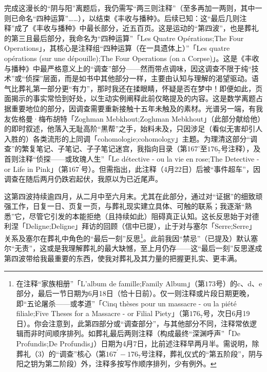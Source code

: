 完成这漫长的“阴与阳”离题后，我仍需写“两三则注释”（至多再加一两则，其中一则已命名“四种运算”……），以结束《丰收与播种》。后续已知：这“最后几则注释”成了《丰收与播种》中最长部分，近五百页。这是运动的“第四波”，也是葬礼的第三且最后部分，我命名为“四种运算”「Les Quatre Opérations;The Four Operations」，其核心是注释组“四种运算（在一具遗体上）”「Les quatre opérations (sur une dépouille);The Four Operations (on a Corpse)」。这是《丰收与播种》中最严格意义上的“调查”部分——然而带点调味，因这调查不限于纯“技术”或“侦探”层面，而是如书中其他部分一样，主要由认知与理解的渴望驱动。语气比葬礼第一部分更“有力”，那时我还在揉眼睛，怀疑是否在梦中！即便如此，页面揭示的事实常恰到好处，以生动实例阐释此前仅略提及的内容。这是数学离题占据重要地位的部分，因调查需要重新接触十五年未触及的素材。光谱另一端，有我友佐格曼·梅布胡特「Zoghman Mebkhout;Zoghman Mebkhout」（此部分献给他）的即时叙述，他落入无耻高阶“黑帮”之手，始料未及，只因涉足（看似无害却引人入胜的）各类流形的上同调「cohomologie;cohomology」主题。为理清这部分“调查”的繁复笔记、子笔记、子子笔记迷宫，我指向目录（第167'至$176_{7}$号注释），及首则注释“侦探——或玫瑰人生”「Le détective - ou la vie en rose;The Detective - or Life in Pink」（第$167^{\prime}$号）。但需指出，此注释（4月22日）后被“事件超车”，因调查在随后两月仍跌宕起伏，我原以为已近尾声。

这第四波持续逾四月，从二月中至六月末。尤其在此部分，通过对“证据”的细致顽强工作，日复一日、页复一页，与葬礼现实建立具体、可触的联系；我逐渐“熟悉”它，尽管它引发的本能拒绝（且持续如此）阻碍真正认知。这长反思始于对德利涅「Deligne;Deligne」拜访的回顾（信中已提），止于对与塞尔「Serre;Serre」关系及塞尔在葬礼中角色的“最后一刻”反思\footnote{在注释“家族相册”「L'album de famille;Family Album」（第$173$号）的c、d、e部分，最后一节日期为6月18日（恰十日前）。仅一则注释或片段日期更晚，即“五论屠杀——或孝道”「Cinq thèses pour un massacre - ou la piété filiale;Five Theses for a Massacre - or Filial Piety」（第$176_{7}$号，次日6月19日）。你会注意到，此第四部分或“调查部分”，与其他部分不同，注释常依逻辑而非时间顺序排列。如葬礼最后两则注释（构成最终“深渊呼声”「De Profundis;De Profundis」）日期为4月7日，比前述注释早两月半。需说明，除葬礼（3）的“调查”核心（第$167^{\prime}-176_{7}$号注释，葬礼仪式的“第五阶段”，阴与阳之钥为第二阶段）外，注释多按写作顺序排列，少有例外。}。此前我因“禁忌”（已提及）默认塞尔“无责”，这或是我理解葬礼的最大缺憾，至上月仍存——这“最后一刻”反思遂成第四波带给我最重要的东西，使我对葬礼及其力量的把握更扎实、更丰满。